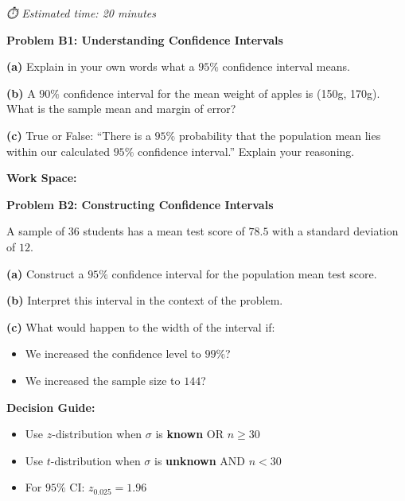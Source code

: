 \documentclass[
  11pt,
]{article}
\begin{document}
\emph{⏱️ Estimated time: 20 minutes}

\textbf{Problem B1: Understanding Confidence Intervals}

\textbf{(a)} Explain in your own words what a \(95\%\) confidence
interval means.

\textbf{(b)} A \(90\%\) confidence interval for the mean weight of
apples is (150g, 170g). What is the sample mean and margin of error?

\textbf{(c)} True or False: ``There is a \(95\%\) probability that the
population mean lies within our calculated \(95\%\) confidence
interval.'' Explain your reasoning.

\textbf{Work Space:}

\textbf{Problem B2: Constructing Confidence Intervals}

A sample of \(36\) students has a mean test score of \(78.5\) with a
standard deviation of \(12\).

\textbf{(a)} Construct a \(95\%\) confidence interval for the population
mean test score.

\textbf{(b)} Interpret this interval in the context of the problem.

\textbf{(c)} What would happen to the width of the interval if:

\begin{itemize}
\item
  We increased the confidence level to \(99\%\)?
\item
  We increased the sample size to \(144\)?
\end{itemize}

\begin{tcolorbox}[enhanced jigsaw, toprule=.15mm, colbacktitle=quarto-callout-tip-color!10!white, colback=white, toptitle=1mm, colframe=quarto-callout-tip-color-frame, bottomrule=.15mm, title=\textcolor{quarto-callout-tip-color}{\faLightbulb}\hspace{0.5em}{Tip}, left=2mm, opacitybacktitle=0.6, bottomtitle=1mm, coltitle=black, titlerule=0mm, breakable, arc=.35mm, opacityback=0, rightrule=.15mm, leftrule=.75mm]

\textbf{Decision Guide:}

\begin{itemize}
\item
  Use \(z\)-distribution when \(\sigma\) is \textbf{known} OR \(n ≥ 30\)
\item
  Use \(t\)-distribution when \(\sigma\) is \textbf{unknown} AND
  \(n < 30\)
\item
  For \(95\%\) CI: \(z_{0.025} = 1.96\)
\end{itemize}

\end{tcolorbox}
\end{document}

